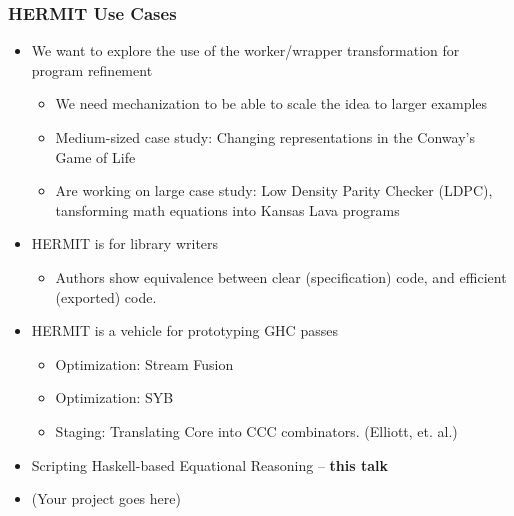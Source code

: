 \begin{frame}
\frametitle{HERMIT Use Cases}

\begin{itemize}
\item
We want to explore the use of the worker/wrapper transformation for program refinement
\begin{itemize}
\item We need mechanization to be able to scale the idea to larger examples
\item Medium-sized case study: Changing representations in the Conway's Game of Life
\item Are working on large case study: Low Density Parity Checker (LDPC),
tansforming math equations into Kansas Lava programs
\end{itemize}

\item
HERMIT is for library writers
\begin{itemize}
\item Authors show equivalence between clear (specification) code, and efficient (exported) code.
\end{itemize}

\item
HERMIT is a vehicle for prototyping GHC passes

\begin{itemize}
\item
Optimization: Stream Fusion

\item
Optimization: SYB
\item

Staging: Translating Core into CCC combinators. (Elliott, et. al.)
\end{itemize}

\item
Scripting Haskell-based Equational Reasoning -- {\bf this talk}

\item
(Your project goes here)
\end{itemize}

\end{frame}
